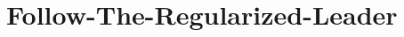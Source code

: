 \documentclass[../main]{subfiles}
\begin{document}
\setcounter{chapter}{6}

\chapter{Follow-The-Regularized-Leader}







\end{document}
